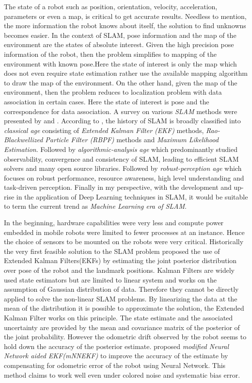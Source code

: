 The state of a robot such as position, orientation, velocity, acceleration, parameters or even a map, is critical to get accurate results. Needless to mention, the more information the robot knows about itself, the solution to find unknowns becomes easier. In the context of SLAM, pose information and the map of the environment are the states of absolute interest. Given the high precision pose information of the robot, then the problem simplifies to mapping of the environment with known pose.Here the state of interest is only the map which does not even require state estimation rather use the available mapping algorithm to draw the map of the environment. On the other hand, given the map of the environment, then the problem reduces to localization problem with data association in certain cases. Here the state of interest is pose and the correspondence for data association. A survey on various \textit{SLAM} methods were presented by \cite{C.Cadena} and \cite{T.Takleh}. According to \cite{C.Cadena}, the history of SLAM is broadly classified into \textit{classical age} consisting of \textit{Extended Kalman Filter (EKF)} methods, \textit{Rao-Blackwellized Particle Filter (RBPF)} methods and \textit{Maximum Likelihood Estimation}. Followed by \textit{algorithmic-analysis age} which predominantly studied observability, convergence and consistency of SLAM, leading to efficient SLAM solvers and many open source libraries. Followed by \textit{robust-perception age} which focuses on robust performance, resource awareness, high level understanding and task-driven perception. Finally in my perspective, with the development and up-rise in the application of Deep Learning techniques in SLAM, it would be suitable to term the current trend as \textit{Machine Learning era of SLAM}.

In the beginning, hardware capabilities were very less and compute power embedded in mobile robots were limited to fewer processes at an instance. Hence the choice of sensors to be mounted on the robots were very critical. Historically the very first feasible solution to the SLAM problem proposed the use of Extended Kalman Filters(EKFs) by estimating the joint posterior distribution over pose of the robot and the landmark positions. Kalman Filters are widely used state estimators but are limited to linear system and works on the assumption of Gaussian distribution of data. Therefore they cannot be directly applied to solve the non-linear SLAM problems. By linearizing the data at the mean of the distribution it is possible to approximate the solution, the Extended Kalman Filter works on this principle. The state estimate and the associated uncertainty are provided by the mean and covariance matrix of the posterior of the joint probability. However the odometric drift observed by the robot seems to hold down the accuracy of the posterior estimate.\cite{J.Kang} proposed \textit{modified Neural Network aided EKF(mNNEKF)} to improve the accuracy of the estimate by compensating for odometric error of the robot using Neural Network. This method claims to work well even under colored noise and systematic bias error.

